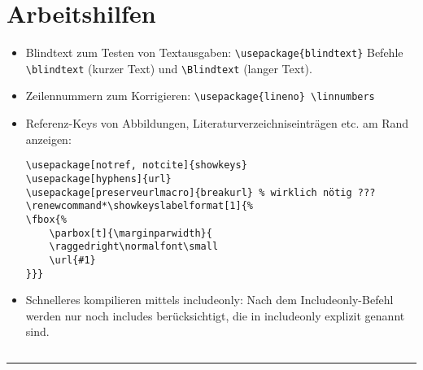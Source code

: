 \section{Arbeitshilfen}

\addtolength{\leftmargini}{-10pt}
\begin{itemize}

	\item Blindtext zum Testen von Textausgaben: \lstinline|\usepackage{blindtext}| \Pfeil Befehle \lstinline|\blindtext| (kurzer Text) und \lstinline|\Blindtext| (langer Text).

	\item Zeilennummern zum Korrigieren: \lstinline|\usepackage{lineno} \linnumbers| 

\item Referenz-Keys von Abbildungen, Literaturverzeichniseinträgen etc. am Rand anzeigen: 
	\begin{lstlisting}
\usepackage[notref, notcite]{showkeys}
\usepackage[hyphens]{url}
\usepackage[preserveurlmacro]{breakurl}	% wirklich nötig ???
\renewcommand*\showkeyslabelformat[1]{%	
\fbox{%
	\parbox[t]{\marginparwidth}{
	\raggedright\normalfont\small
	\url{#1}
}}}
	\end{lstlisting}
	
\item Schnelleres kompilieren mittels includeonly: Nach dem Includeonly-Befehl werden nur noch includes berücksichtigt, die in includeonly explizit genannt sind.
\begin{lstlisting}

\end{lstlisting}

\end{itemize}

\hrule \vspace{0.5\baselineskip}

